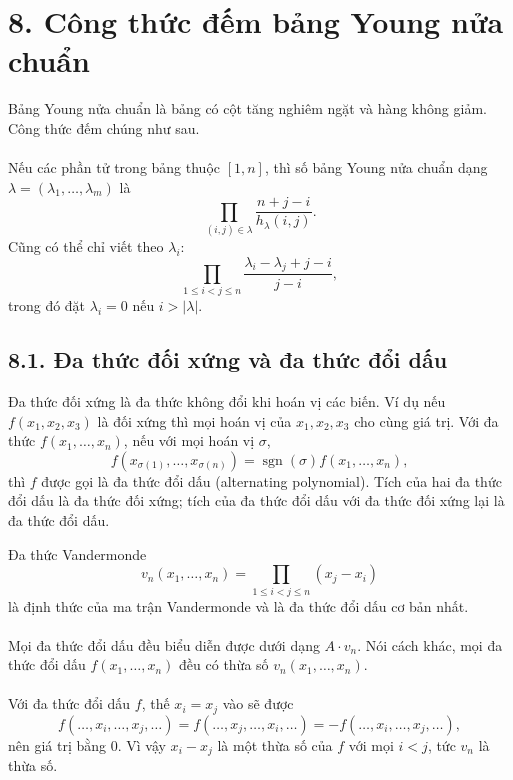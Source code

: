 \documentclass[11pt]{article}
\begin{document}
\section*{8. Công thức đếm bảng Young nửa chuẩn}

Bảng Young nửa chuẩn là bảng có cột tăng nghiêm ngặt và hàng không giảm. Công
thức đếm chúng như sau.

\paragraph{}
Nếu các phần tử trong bảng thuộc \([1,n]\), thì số bảng Young nửa chuẩn dạng
\(\lambda=(\lambda_1,\ldots,\lambda_m)\) là
\[
\prod_{(i,j)\in\lambda}\frac{n+j-i}{h_\lambda(i,j)}.
\]
Cũng có thể chỉ viết theo \(\lambda_i\):
\[
\prod_{1\le i<j\le n}\frac{\lambda_i-\lambda_j+j-i}{j-i},
\]
trong đó đặt \(\lambda_i=0\) nếu \(i>|\lambda|\).

\subsection*{8.1. Đa thức đối xứng và đa thức đổi dấu}

Đa thức đối xứng là đa thức không đổi khi hoán vị các biến. Ví dụ nếu
\(f(x_1,x_2,x_3)\) là đối xứng thì mọi hoán vị của \(x_1,x_2,x_3\) cho cùng
giá trị. Với đa thức \(f(x_1,\ldots,x_n)\), nếu với mọi hoán vị \(\sigma\),
\[
f(x_{\sigma(1)},\ldots,x_{\sigma(n)})
=\operatorname{sgn}(\sigma)f(x_1,\ldots,x_n),
\]
thì \(f\) được gọi là đa thức đổi dấu (alternating polynomial). Tích của hai
đa thức đổi dấu là đa thức đối xứng; tích của đa thức đổi dấu với đa thức đối
xứng lại là đa thức đổi dấu.

Đa thức Vandermonde
\[
v_n(x_1,\ldots,x_n)=\prod_{1\le i<j\le n}(x_j-x_i)
\]
là định thức của ma trận Vandermonde và là đa thức đổi dấu cơ bản nhất.

\paragraph{}
Mọi đa thức đổi dấu đều biểu diễn được dưới dạng \(A\cdot v_n\). Nói cách
khác, mọi đa thức đổi dấu \(f(x_1,\ldots,x_n)\) đều có thừa số
\(v_n(x_1,\ldots,x_n)\).

\paragraph{}
Với đa thức đổi dấu \(f\), thế \(x_i=x_j\) vào sẽ được
\[
f(\ldots,x_i,\ldots,x_j,\ldots)
=f(\ldots,x_j,\ldots,x_i,\ldots)
=-f(\ldots,x_i,\ldots,x_j,\ldots),
\]
nên giá trị bằng \(0\). Vì vậy \(x_i-x_j\) là một thừa số của \(f\) với mọi
\(i<j\), tức \(v_n\) là thừa số.
\end{document}
